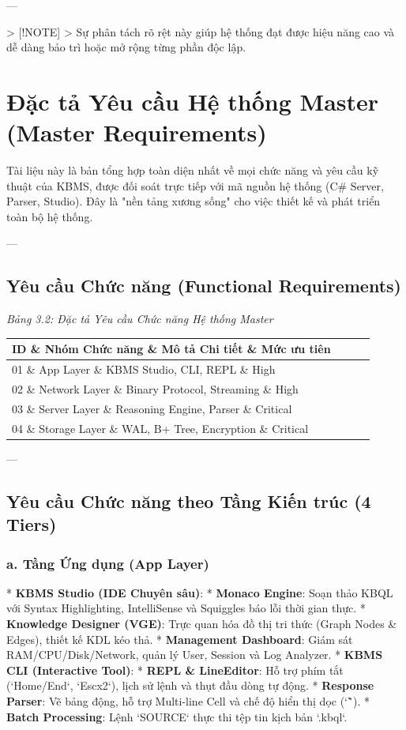 ---

> [!NOTE]
> Sự phân tách rõ rệt này giúp hệ thống đạt được hiệu năng cao và dễ dàng bảo trì hoặc mở rộng từng phần độc lập.

\section{Đặc tả Yêu cầu Hệ thống Master (Master Requirements)}

Tài liệu này là bản tổng hợp toàn diện nhất về mọi chức năng và yêu cầu kỹ thuật của KBMS, được đối soát trực tiếp với mã nguồn hệ thống (C\# Server, Parser, Studio). Đây là "nền tảng xương sống" cho việc thiết kế và phát triển toàn bộ hệ thống.

---

\subsection{Yêu cầu Chức năng (Functional Requirements)}

\textit{Bảng 3.2: Đặc tả Yêu cầu Chức năng Hệ thống Master}
\begin{table}[ht!]
\centering
\begin{tabular}{|l|l|l|l|}
\hline
ID \& Nhóm Chức năng \& Mô tả Chi tiết \& Mức ưu tiên \\ \hline
01 \& App Layer \& KBMS Studio, CLI, REPL \& High \\ \hline
02 \& Network Layer \& Binary Protocol, Streaming \& High \\ \hline
03 \& Server Layer \& Reasoning Engine, Parser \& Critical \\ \hline
04 \& Storage Layer \& WAL, B+ Tree, Encryption \& Critical \\ \hline
\end{tabular}
\end{table}
---

\subsection{Yêu cầu Chức năng theo Tầng Kiến trúc (4 Tiers)}

\subsubsection{a. Tầng Ứng dụng (App Layer)}

*   \textbf{KBMS Studio (IDE Chuyên sâu)}:
    *   \textbf{Monaco Engine}: Soạn thảo KBQL với Syntax Highlighting, IntelliSense và Squiggles báo lỗi thời gian thực.
    *   \textbf{Knowledge Designer (VGE)}: Trực quan hóa đồ thị tri thức (Graph Nodes \& Edges), thiết kế KDL kéo thả.
    *   \textbf{Management Dashboard}: Giám sát RAM/CPU/Disk/Network, quản lý User, Session và Log Analyzer.
*   \textbf{KBMS CLI (Interactive Tool)}:
    *   \textbf{REPL \& LineEditor}: Hỗ trợ phím tắt (`Home/End`, `Escx2`), lịch sử lệnh và thụt đầu dòng tự động.
    *   \textbf{Response Parser}: Vẽ bảng động, hỗ trợ Multi-line Cell và chế độ hiển thị dọc (`\G`).
    *   \textbf{Batch Processing}: Lệnh `SOURCE` thực thi tệp tin kịch bản `.kbql`.

